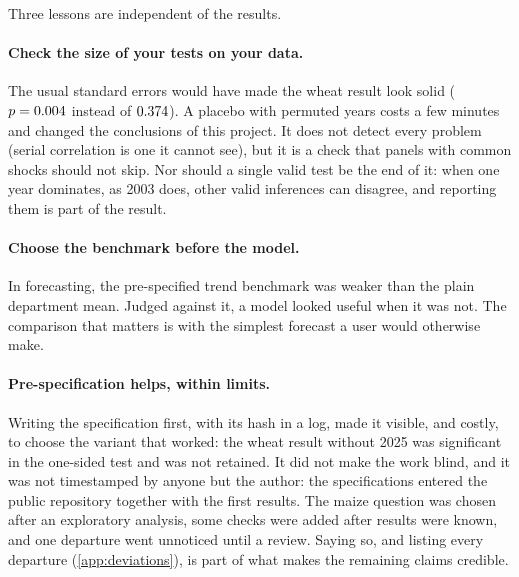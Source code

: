 Three lessons are independent of the results.

\paragraph{Check the size of your tests on your data.} The usual standard errors would have made the wheat result look solid ($p = 0.004$ instead of $0.374$). A placebo with permuted years costs a few minutes and changed the conclusions of this project. It does not detect every problem (serial correlation is one it cannot see), but it is a check that panels with common shocks should not skip. Nor should a single valid test be the end of it: when one year dominates, as 2003 does, other valid inferences can disagree, and reporting them is part of the result.

\paragraph{Choose the benchmark before the model.} In forecasting, the pre-specified trend benchmark was weaker than the plain department mean. Judged against it, a model looked useful when it was not. The comparison that matters is with the simplest forecast a user would otherwise make.

\paragraph{Pre-specification helps, within limits.} Writing the specification first, with its hash in a log, made it visible, and costly, to choose the variant that worked: the wheat result without 2025 was significant in the one-sided test and was not retained. It did not make the work blind, and it was not timestamped by anyone but the author: the specifications entered the public repository together with the first results. The maize question was chosen after an exploratory analysis, some checks were added after results were known, and one departure went unnoticed until a review. Saying so, and listing every departure (\cref{app:deviations}), is part of what makes the remaining claims credible.
